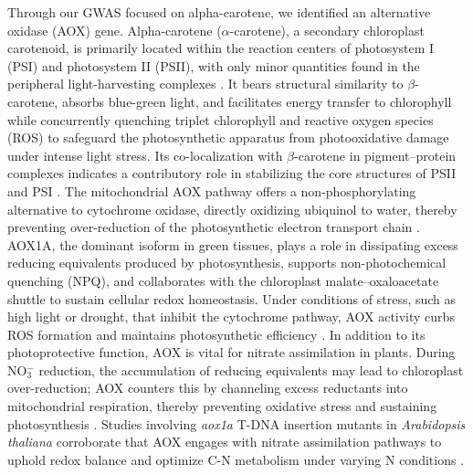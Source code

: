\documentclass[10pt,letterpaper]{article}
\begin{document}
\begin{itemize}
Through our GWAS focused on alpha-carotene, we  identified an alternative oxidase (AOX) gene. Alpha-carotene (\(\alpha\)-carotene), a secondary chloroplast carotenoid, is primarily located within the reaction centers of photosystem I (PSI) and photosystem II (PSII), with only minor quantities found in the peripheral light-harvesting complexes \citep{Young1989}. It bears structural similarity to \(\beta\)-carotene, absorbs blue-green light, and facilitates energy transfer to chlorophyll while concurrently quenching triplet chlorophyll and reactive oxygen species (ROS) to safeguard the photosynthetic apparatus from photooxidative damage under intense light stress. Its co-localization with \(\beta\)-carotene in pigment–protein complexes indicates a contributory role in stabilizing the core structures of PSII and PSI \citep{Young1989}. The mitochondrial AOX pathway offers a non-phosphorylating alternative to cytochrome oxidase, directly oxidizing ubiquinol to water, thereby preventing over-reduction of the photosynthetic electron transport chain \citep{Vishwakarma2015}. AOX1A, the dominant isoform in green tissues, plays a role in dissipating excess reducing equivalents produced by photosynthesis, supports non-photochemical quenching (NPQ), and collaborates with the chloroplast malate–oxaloacetate shuttle to sustain cellular redox homeostasis. Under conditions of stress, such as high light or drought, that inhibit the cytochrome pathway, AOX activity curbs ROS formation and maintains photosynthetic efficiency \citep{Vishwakarma2015}. In addition to its photoprotective function, AOX is vital for nitrate assimilation in plants. During NO\(_3^-\) reduction, the accumulation of reducing equivalents may lead to chloroplast over-reduction; AOX counters this by channeling excess reductants into mitochondrial respiration, thereby preventing oxidative stress and sustaining photosynthesis \citep{Gandin2014}. Studies involving \emph{aox1a} T-DNA insertion mutants in \emph{Arabidopsis thaliana} corroborate that AOX engages with nitrate assimilation pathways to uphold redox balance and optimize C-N metabolism under varying N conditions \citep{Gandin2014,Vishwakarma2015}.



\end{itemize}
\end{document}
